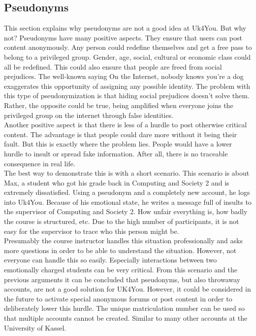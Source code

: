 \subsection{Pseudonyms}
This section explains why pseudonyms are not a good idea at Uk4You.
But why not? Pseudonyms have many positive aspects.
They ensure that users can post content anonymously.
Any person could redefine themselves and get a free pass to belong to a privileged group.
Gender, age, social, cultural or economic class could all be redefined.
This could also ensure that people are freed from social prejudices.
The well-known saying \glqq On the Internet, nobody knows you're a dog\grqq{} exaggerates this opportunity of assigning any possible identity\cite{steiner-internet-dog}.
The problem with this type of pseudonymization is that hiding social prejudices doesn't solve them.
Rather, the opposite could be true, being amplified when everyone joins the privileged group on the internet through false identities.\\

Another positive aspect is that there is less of a hurdle to post otherwise critical content.
The advantage is that people could dare more without it being their fault.
But this is exactly where the problem lies.
People would have a lower hurdle to insult or spread fake information.
After all, there is no traceable consequence in real life.\\

The best way to demonstrate this is with a short scenario.
This scenario is about Max, a student who got his grade back in Computing and Society 2 and is extremely dissatisfied.
Using a pseudonym and a completely new account, he logs into Uk4You.
Because of his emotional state, he writes a message full of insults to the supervisor of Computing and Society 2.
How unfair everything is, how badly the course is structured, etc.
Due to the high number of participants, it is not easy for the supervisor to trace who this person might be.\\

Presumably the course instructor handles this situation professionally and asks more questions in order to be able to understand the situation.
However, not everyone can handle this so easily.
Especially interactions between two emotionally charged students can be very critical.
From this scenario and the previous arguments it can be concluded that pseudonyms, but also throwaway accounts, are not a good solution for UK4You.
However, it could be considered in the future to activate special anonymous forums or post content in order to deliberately lower this hurdle.
The unique matriculation number can be used so that multiple accounts cannot be created.
Similar to many other accounts at the University of Kassel.

